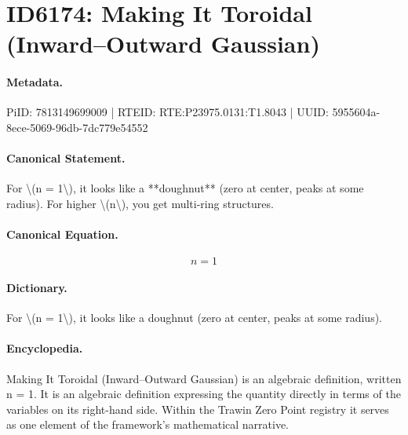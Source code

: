 \section*{ID6174: Making It Toroidal (Inward–Outward Gaussian)}
\paragraph{Metadata.}
PiID: 7813149699009 | RTEID: RTE:P23975.0131:T1.8043 | UUID: 5955604a-8ece-5069-96db-7dc779e54552

\paragraph{Canonical Statement.}
For \textbackslash{}(n = 1\textbackslash{}), it looks like a **doughnut** (zero at center, peaks at some radius). For higher \textbackslash{}(n\textbackslash{}), you get multi-ring structures.

\paragraph{Canonical Equation.}
\[
n = 1
\]

\paragraph{Dictionary.}
For \textbackslash{}(n = 1\textbackslash{}), it looks like a doughnut (zero at center, peaks at some radius).

\paragraph{Encyclopedia.}
Making It Toroidal (Inward–Outward Gaussian) is an algebraic definition, written n = 1. It is an algebraic definition expressing the quantity directly in terms of the variables on its right-hand side. Within the Trawin Zero Point registry it serves as one element of the framework's mathematical narrative.
